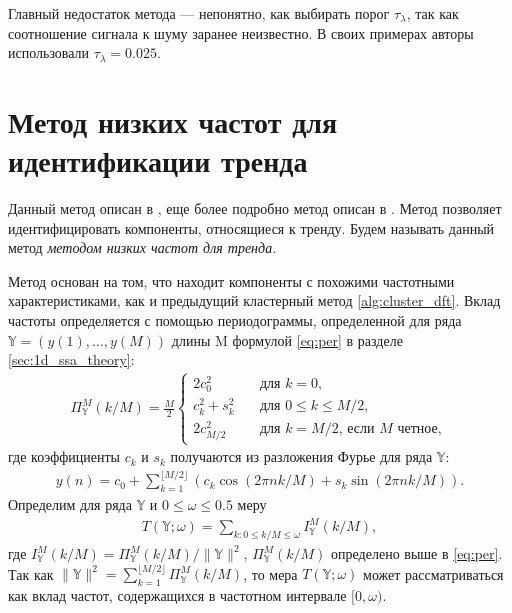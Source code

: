 \documentclass[specialist,
               substylefile = spbu.rtx,
               subf,href,colorlinks=true, 12pt]{disser}
\begin{document}
Главный недостаток метода --- непонятно, как выбирать порог  $\tau_\lambda$, так как соотношение сигнала к шуму заранее неизвестно.  В своих примерах авторы использовали $\tau_\lambda = 0.025$.

\section{Метод низких частот для идентификации тренда}
\label{sec:1d_freq_method}
Данный метод описан в \cite{Golyandina.Zhigljavsky2012}, еще более подробно метод описан в \cite{Alexandrov2006}. Метод позволяет идентифицировать компоненты, относящиеся к тренду.
 Будем называть данный метод \textit{методом низких частот для тренда}.

Метод основан на том, что находит компоненты с похожими частотными характеристиками, как и предыдущий кластерный метод \ref{alg:cluster_dft}. Вклад частоты определяется с помощью периодограммы, определенной для ряда $\mathbb{Y}=(y(1),\ldots,y({M}))$ длины M формулой \eqref{eq:per} в разделе \ref{sec:1d_ssa_theory}:
\begin{gather*}
 \Pi_{\mathbb{Y}}^M(k/M) = \frac{M}{2}
\begin{cases}
2c_0^2 &\quad \text{для } k = 0, \\
c_k^2 + s_k^2 & \quad \text{для }  0 \leqslant k \leqslant M/2, \\
2c_{M/2}^2 & \quad \text{для } k = M/2   \text{, если } M \text{ четное},
\end{cases}
\end{gather*}
где коэффициенты $c_k$ и $s_k$ получаются из разложения Фурье для ряда $\mathbb{Y}$:
\begin{gather*}
y(n) = c_0 + \sum_{k=1}^{\lfloor M/2 \rfloor}\left(c_k\cos(2\pi n k /M) + s_k\sin(2\pi n k/M) \right).
\end{gather*}
Определим для ряда $\mathbb{Y}$ и $0 \leqslant  \omega \leqslant 0.5$ меру
\begin{gather}
\label{eq:T_measure}
T(\mathbb{Y}; \omega) = \sum_{k: 0 \leqslant k/M \leqslant \omega} I_{\mathbb{Y}}^M(k/M),
\end{gather}
где $I_{\mathbb{Y}}^M(k/M) = \Pi_{\mathbb{Y}}^M(k/M) / \|\mathbb{Y}\|^2$, $\Pi_{\mathbb{Y}}^M(k/M)$ определено выше в \eqref{eq:per}. Так как $\|\mathbb{Y}\|^2  = \sum_{k=1}^{\lfloor M/2 \rfloor} \Pi_{\mathbb{Y}}^M(k/M)$, то мера $T(\mathbb{Y}; \omega)$ может рассматриваться как вклад частот, содержащихся в частотном интервале $[0, \omega)$.
\end{document}
